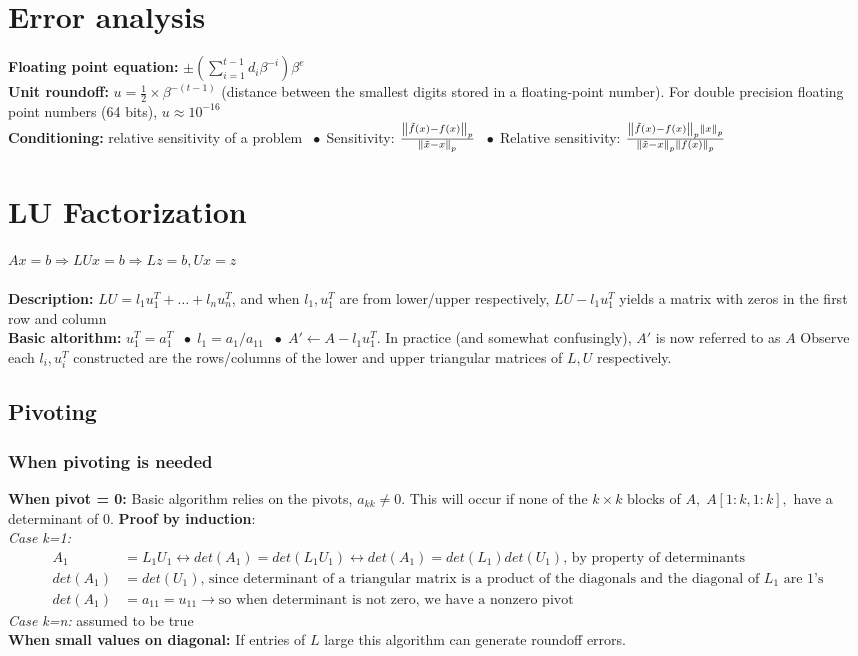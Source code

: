 \documentclass{article}
\newcommand{\norm}[2]{\left\lVert#1\right\rVert_#2}
\newcommand*\bspace{$\; \bullet \;$}
\begin{document}
\section{Error analysis}
\textbf{Floating point equation:} $\pm (\sum_{i=1}^{t-1} d_i\beta^{-i})\beta^e$\\
\textbf{Unit roundoff:} $u = \frac{1}{2} \times \beta^{-(t-1)}$ (distance between the smallest digits stored in a floating-point number). For double precision floating point numbers (64 bits), $u \approx 10^{-16}$\\
\textbf{Conditioning: } relative sensitivity of a problem \bspace Sensitivity: $\frac{\norm{\Tilde{f}(x) - f(x)}{p}}{\norm{\Tilde{x} - x}{p}}$ \bspace Relative sensitivity: $\frac{\norm{\Tilde{f}(x) - f(x)}{p}\norm{x}{p}}{\norm{\Tilde{x} - x}{p}\norm{f(x)}{p}}$


\section{LU Factorization}
$Ax=b \Longrightarrow LUx=b \Longrightarrow Lz=b, Ux=z$\\\\
\textbf{Description: } $LU = l_1u_1^T + \dots + l_nu_n^T$, and when $l_1, u_1^T$ are from lower/upper respectively, $LU - l_1u_1^T$ yields a matrix with zeros in the first row and column\\
\textbf{Basic altorithm:} $u_1^T = a_1^T$ \bspace $l_1 = a_1/a_{11}$ \bspace $A' \leftarrow A - l_1u_1^T$. In practice (and somewhat confusingly), $A'$ is now referred to as $A$ Observe each $l_i, u_i^T$ constructed are the rows/columns of the lower and upper triangular matrices of $L, U$ respectively.

\subsection{Pivoting}
\subsubsection{When pivoting is needed}
\textbf{When pivot = 0:} Basic algorithm relies on the pivots, $a_{kk}\neq 0$. This will occur if none of the $k \times k$ blocks of $A, \; A[1:k, 1:k],$ have a determinant of 0. \textbf{Proof by induction}:\\
\textit{Case k=1:} 
\begin{align*}
    A_1 &= L_1U_1 \longleftrightarrow det(A_1) = det(L_1U_1) \longleftrightarrow det(A_1) = det(L_1)det(U_1) \textrm{, by property of determinants}\\
    det(A_1) &= det(U_1) \textrm{, since determinant of a triangular matrix is a product of the diagonals and the diagonal of $L_1$ are 1's}\\
    det(A_1) &= a_{11} = u_{11} \rightarrow \textrm{so when determinant is not zero, we have a nonzero pivot}
\end{align*}
\textit{Case k=n:} assumed to be true\\
\textbf{When small values on diagonal:} If entries of $L$ large this algorithm can generate roundoff errors.
\end{document}
